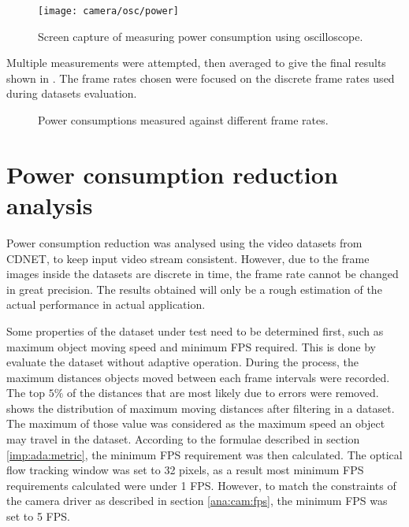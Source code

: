 \begin{figure}[htb]
  \centering
  \texttt{[image: camera/osc/power]}
  \caption{Screen capture of measuring power consumption using oscilloscope.}
  \label{ana:cam:osc:power}
\end{figure}

Multiple measurements were attempted, then averaged to give the final results shown in . The frame rates chosen were focused on the discrete frame rates used during datasets evaluation.

\begin{figure}[htb]
  \centering
  \centering
  \caption{Power consumptions measured against different frame rates.}
  \label{ana:cam:power}
\end{figure}


\section{Power consumption reduction analysis}

Power consumption reduction was analysed using the video datasets from CDNET, to keep input video stream consistent. However, due to the frame images inside the datasets are discrete in time, the frame rate cannot be changed in great precision. The results obtained will only be a rough estimation of the actual performance in actual application.

Some properties of the dataset under test need to be determined first, such as maximum object moving speed and minimum FPS required. This is done by evaluate the dataset without adaptive operation. During the process, the maximum distances objects moved between each frame intervals were recorded. The top $5 \%$ of the distances that are most likely due to errors were removed.  shows the distribution of maximum moving distances after filtering in a dataset. The maximum of those value was considered as the maximum speed an object may travel in the dataset. According to the formulae described in section \ref{imp:ada:metric}, the minimum FPS requirement was then calculated. The optical flow tracking window was set to 32 pixels, as a result most minimum FPS requirements calculated were under 1 FPS. However, to match the constraints of the camera driver as described in section \ref{ana:cam:fps}, the minimum FPS was set to 5 FPS.


